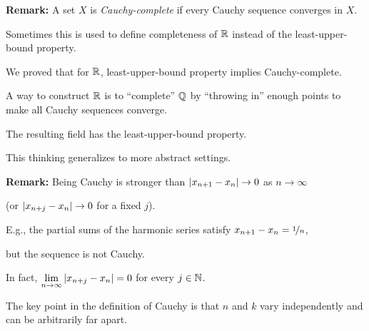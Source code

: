 \documentclass[10pt,aspectratio=149]{beamer}
\begin{document}
\begin{frame}

\textbf{Remark:}
A set $X$ is
\emph{Cauchy-complete}
if every Cauchy sequence converges in $X$.

\pause
Sometimes this is used to define completeness of ${\mathbb{R}}$ instead of
the least-upper-bound property.

\pause
We proved that for ${\mathbb{R}}$,
least-upper-bound property implies
Cauchy-complete.

\pause
A way to construct ${\mathbb{R}}$ is to
``complete'' ${\mathbb{Q}}$ by ``throwing in'' enough points to make all
Cauchy sequences converge.

\pause
The resulting field has the
least-upper-bound property.

\pause
This thinking generalizes to more abstract settings.

\pause
\medskip

\textbf{Remark:}
Being Cauchy is stronger than 
$\left\lvert {x_{n+1}-x_n} \right\rvert \to 0$
as $n \to \infty$

\pause
(or $\left\lvert {x_{n+j}-x_n} \right\rvert \to 0$ for a fixed $j$).

\pause
E.g., the partial sums of the harmonic series satisfy
$x_{n+1}-x_n = \nicefrac{1}{n}$,

but the sequence is not Cauchy.

\pause
In fact,
$\lim\limits_{n\to\infty} \left\lvert {x_{n+j}-x_n} \right\rvert = 0$ for
every $j \in {\mathbb{N}}$.

\pause
The key point in the definition of Cauchy is that $n$ and $k$
vary independently and can be arbitrarily far apart.

\end{frame}
\end{document}
